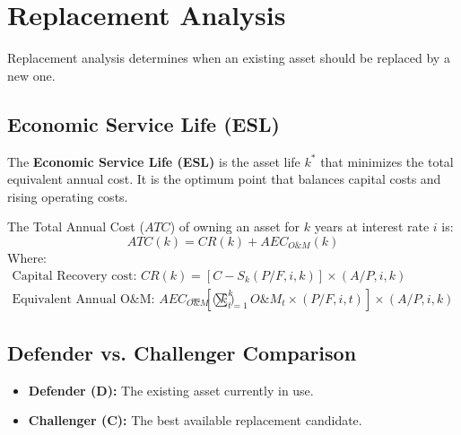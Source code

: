 \documentclass[12pt,a4paper]{article}
\begin{document}
\section{Replacement Analysis}

Replacement analysis determines when an existing asset should be replaced by a new one.

\subsection{Economic Service Life (ESL)}
The \textbf{Economic Service Life (ESL)} is the asset life $k^*$ that minimizes the total equivalent annual cost. It is the optimum point that balances capital costs and rising operating costs.

\begin{tcolorbox}[formulabox, title={\textbf{Total Annual Cost Equation}}]
The Total Annual Cost ($ATC$) of owning an asset for $k$ years at interest rate $i$ is:
\begin{equation}
  ATC(k) = CR(k) + AEC_{O\&M}(k)
\end{equation}
Where:
\begin{align}
  \text{Capital Recovery cost: } CR(k) &= [C - S_k(P/F, i, k)] \times (A/P, i, k) \\[4pt]
  \text{Equivalent Annual O\&M: } AEC_{O\&M}(k) &= \left[ \sum_{t=1}^{k} O\&M_t \times (P/F, i, t) \right] \times (A/P, i, k)
\end{align}
\end{tcolorbox}

\subsection{Defender vs. Challenger Comparison}
\begin{itemize}[leftmargin=*, itemsep=4pt]
  \item \textbf{Defender (D):} The existing asset currently in use.
  \item \textbf{Challenger (C):} The best available replacement candidate.
\end{itemize}
\end{document}
